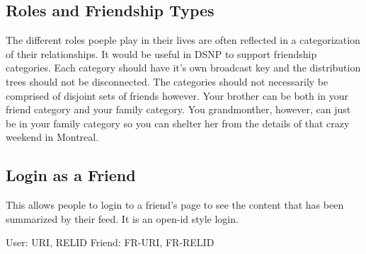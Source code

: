 \documentclass[letterpaper,11pt,oneside]{article}
\begin{document}
\subsection{Roles and Friendship Types}

The different roles poeple play in their lives are often reflected in a
categorization of their relationships. It would be useful in DSNP to support
friendship categories. Each category should have it's own broadcast key and the
distribution trees should not be disconnected. The categories should not
necessarily be comprised of disjoint sets of friends however. Your brother can
be both in your friend category and your family category. You grandmonther,
however, can just be in your family category so you can shelter her from the
details of that crazy weekend in Montreal.

\subsection{Login as a Friend}

This allows people to login to a friend's page to see the content that has been
summarized by their feed. It is an open-id style login.

User:     URI,    RELID
Friend:   FR-URI, FR-RELID
\end{document}
